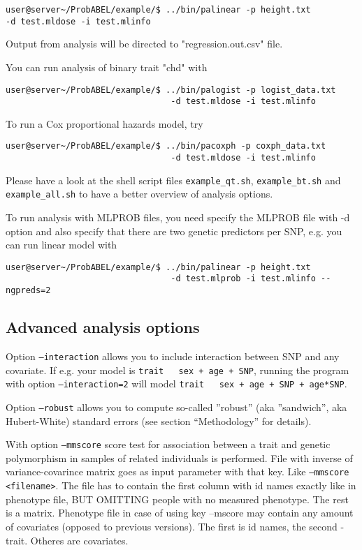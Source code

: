 \documentclass[12pt,a4paper]{article}
\begin{document}
\begin{verbatim}
user@server~/ProbABEL/example/$ ../bin/palinear -p height.txt 
-d test.mldose -i test.mlinfo
\end{verbatim}

Output from analysis will be directed to "regression.out.csv" file.

You can run analysis of binary trait "chd" with 

\begin{verbatim}
user@server~/ProbABEL/example/$ ../bin/palogist -p logist_data.txt 
                                 -d test.mldose -i test.mlinfo
\end{verbatim}

To run a Cox proportional hazards model, try 

\begin{verbatim}
user@server~/ProbABEL/example/$ ../bin/pacoxph -p coxph_data.txt 
                                 -d test.mldose -i test.mlinfo
\end{verbatim}

Please have a look at the shell script files \texttt{example\_qt.sh}, 
\texttt{example\_bt.sh} and \texttt{example\_all.sh} to have 
a better overview of analysis options.

To run analysis with MLPROB files, you need specify the MLPROB file 
with -d option and also specify that there are two genetic predictors 
per SNP, e.g. you can run linear model with

\begin{verbatim}
user@server~/ProbABEL/example/$ ../bin/palinear -p height.txt 
                                 -d test.mlprob -i test.mlinfo --ngpreds=2
\end{verbatim}

\subsection{Advanced analysis options}

Option \texttt{--interaction} allows you to include interaction between SNP 
and any covariate. If e.g. your model is \texttt{trait ~ sex + age + SNP}, 
running the program with option \texttt{--interaction=2} will model 
\texttt{trait ~ sex + age + SNP + age*SNP}.

Option \texttt{--robust} allows you to compute so-called ''robust'' (aka
''sandwich'', aka Hubert-White) standard errors (see section ``Methodology''
for details).

With option \texttt{--mmscore} score test for association between a trait and genetic
polymorphism  in samples of related individuals is performed. File with inverse of variance-covarince matrix goes as input parameter
with that key. Like \texttt{--mmscore <filename>}. The file has to contain the first column with id names exactly like in phenotype file, BUT OMITTING people with no measured phenotype. The rest is a matrix.
Phenotype file in case of using key --mscore may contain any amount of covariates (opposed to previous versions). The first is id names, the second - trait. 
Otheres are covariates.
\end{document}
